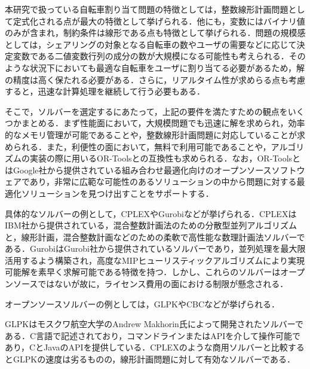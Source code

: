           \par 本研究で扱っている自転車割り当て問題の特徴としては，整数線形計画問題として定式化される点が最大の特徴として挙げられる．他にも，変数にはバイナリ値のみが含まれ，制約条件は線形である点も特徴として挙げられる．問題の規模感としては，シェアリングの対象となる自転車の数やユーザの需要などに応じて決定変数である二値変数行列の成分の数が大規模になる可能性も考えられる．そのような状況下においても最適な自転車をユーザに割り当てる必要があるため，解の精度は高く保たれる必要がある．さらに，リアルタイム性が求めらる点も考慮すると，迅速な計算処理を継続して行う必要もある．
          
          \par そこで，ソルバーを選定するにあたって，上記の要件を満たすための観点をいくつかまとめる．まず性能面において，大規模問題でも迅速に解を求められ，効率的なメモリ管理が可能であることや，整数線形計画問題に対応していることが求められる．また，利便性の面において，無料で利用可能であることや，アルゴリズムの実装の際に用いるOR-Toolsとの互換性も求められる．なお，OR-ToolsとはGoogle社から提供されている組み合わせ最適化向けのオープンソースソフトウェアであり，非常に広範な可能性のあるソリューションの中から問題に対する最適化ソリューションを見つけ出すことをサポートする．
          
          \par 具体的なソルバーの例として，CPLEXやGurobiなどが挙げられる．CPLEXはIBM社から提供されている，混合整数計画法のための分散型並列アルゴリズムと，線形計画，混合整数計画などのための柔軟で高性能な数理計画法ソルバーである．GurobiはGurobi社から提供されているソルバーであり，並列処理を最大限活用するよう構築され，高度なMIPヒューリスティックアルゴリズムにより実現可能解を素早く求解可能である特徴を持つ．しかし、これらのソルバーはオープンソースではないが故に，ライセンス費用の面における制限が懸念される．
          
          \par オープンソースソルバーの例としては，GLPKやCBCなどが挙げられる．
          
          \par GLPKはモスクワ航空大学のAndrew Makhorin氏によって開発されたソルバーである．C言語で記述されており，コマンドラインまたはAPIを介して操作可能であり，CとJavaのAPIを提供している．CPLEXのような商用ソルバーと比較するとGLPKの速度は劣るものの，線形計画問題に対して有効なソルバーである．
          

